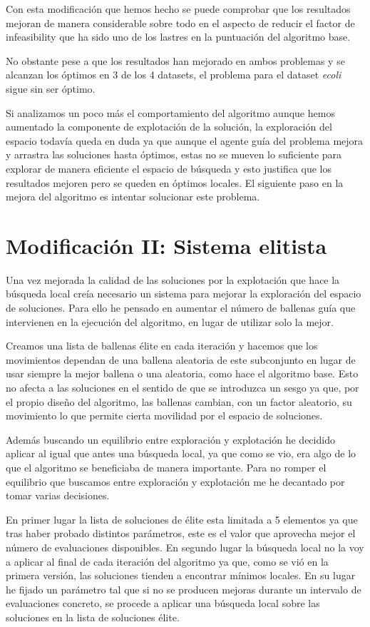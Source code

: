 \documentclass[11pt]{article}
\begin{document}
Con esta modificación que hemos hecho se puede comprobar que los resultados
mejoran de manera considerable sobre todo en el aspecto de reducir el factor de
infeasibility que ha sido uno de los lastres en la puntuación del algoritmo
base. 

No obstante pese a que los resultados han mejorado en ambos problemas y se
alcanzan los óptimos en 3 de los 4 datasets, el problema para el dataset
\textit{ecoli} sigue sin ser óptimo. 

Si analizamos un poco más el comportamiento del algoritmo aunque hemos aumentado
la componente de explotación de la solución, la exploración del espacio todavía
queda en duda ya que aunque el agente guía del problema mejora y arrastra las
soluciones hasta óptimos, estas no se mueven lo suficiente para explorar de
manera eficiente el espacio de búsqueda y esto justifica que los resultados
mejoren pero se queden en óptimos locales. El siguiente paso en la mejora del
algoritmo es intentar solucionar este problema.

\section{Modificación II: Sistema elitista}

Una vez mejorada la calidad de las soluciones por la explotación que hace la
búsqueda local creía necesario un sistema para mejorar la exploración del
espacio de soluciones. Para ello he pensado en aumentar el número de ballenas
guía que intervienen en la ejecución del algoritmo, en lugar de utilizar solo la
mejor. 

Creamos una lista de ballenas élite en cada iteración y hacemos que los
movimientos dependan de una ballena aleatoria de este subconjunto en lugar de
usar siempre la mejor ballena o una aleatoria, como hace el algoritmo base. Esto
no afecta a las soluciones en el sentido de que se introduzca un sesgo ya que,
por el propio diseño del algoritmo, las ballenas cambian, con un factor aleatorio,
su movimiento lo que permite cierta movilidad por el espacio de
soluciones.

Además buscando un equilibrio entre exploración y explotación he decidido
aplicar al igual que antes una búsqueda local, ya que como se vio, era algo de
lo que el algoritmo se beneficiaba de manera importante. Para no romper el
equilibrio que buscamos entre exploración y explotación me he decantado por 
tomar varias decisiones.

En primer lugar la lista de soluciones de élite esta limitada a 5 elementos ya
que tras haber probado distintos parámetros, este es el valor que aprovecha mejor
el número de evaluaciones disponibles. En segundo lugar la búsqueda local no la
voy a aplicar al final de cada iteración del algoritmo ya que, como se vió en la
primera versión, las soluciones tienden a encontrar mínimos locales. En su lugar
he fijado un parámetro tal que si no se producen mejoras durante un intervalo de
evaluaciones concreto, se procede a aplicar una búsqueda local sobre las
soluciones en la lista de soluciones élite.
\end{document}
